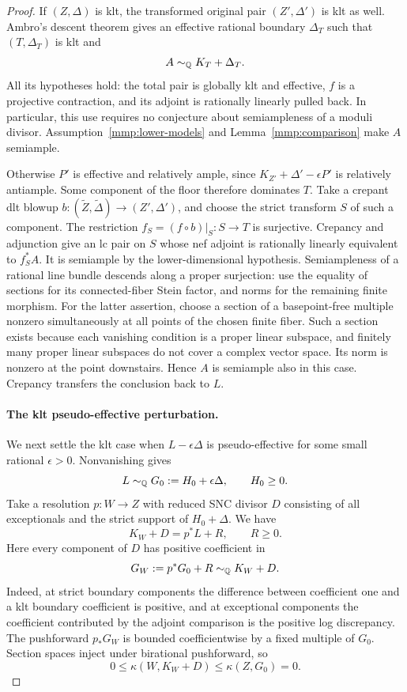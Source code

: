 \begin{proof}
If \((Z,\Delta)\) is klt, the transformed original pair
\((Z',\Delta')\) is klt as well. Ambro's descent theorem
\cite[Theorem~0.2]{Ambro2005} gives an effective rational
boundary \(\Delta_T\) such that \((T,\Delta_T)\) is klt and
\[
 A\sim_{\mathbb{Q}}K_T+\Delta_T.
\]
All its hypotheses hold: the total pair is globally klt and
effective, \(f\) is a projective contraction, and its adjoint
is rationally linearly pulled back. In particular, this use
requires no conjecture about semiampleness of a moduli divisor.
Assumption~\ref{mmp:lower-models} and
Lemma~\ref{mmp:comparison} make \(A\) semiample.

Otherwise \(P'\) is effective and relatively ample, since
\(K_{Z'}+\Delta'-\epsilon P'\) is relatively antiample.
Some component of the floor therefore dominates \(T\).
Take a crepant dlt blowup $b:(\widetilde Z,\widetilde\Delta)
\to(Z',\Delta')$, and choose the strict transform $S$ of such
a component. The restriction $f_S=(f\circ b)|_S:S\to T$ is
surjective. Crepancy and adjunction give an lc pair on $S$
whose nef adjoint is rationally linearly equivalent to $f_S^*A$.
It is semiample by the lower-dimensional hypothesis.
Semiampleness of a rational line bundle descends along a proper
surjection: use the equality of sections for its connected-fiber
Stein factor, and norms for the remaining finite morphism.
For the latter assertion, choose a section of a basepoint-free
multiple nonzero simultaneously at all points of the chosen
finite fiber. Such a section exists because each vanishing
condition is a proper linear subspace, and finitely many proper
linear subspaces do not cover a complex vector space. Its norm
is nonzero at the point downstairs. Hence \(A\) is semiample
also in this case. Crepancy transfers the conclusion back to \(L\).

\paragraph{The klt pseudo-effective perturbation.}
We next settle the klt case when \(L-\epsilon\Delta\) is
pseudo-effective for some small rational \(\epsilon>0\).
Nonvanishing gives
\[
 L\sim_{\mathbb{Q}}G_0:=H_0+\epsilon\Delta,\qquad H_0\geq 0.
\]
Take a resolution \(p\colon W\to Z\) with reduced SNC divisor
\(D\) consisting of all exceptionals and the strict support of
\(H_0+\Delta\). We have
\[
 K_W+D=p^*L+R,\qquad R\geq 0.
\]
Here every component of \(D\) has positive coefficient in
\[
 G_W:=p^*G_0+R\sim_{\mathbb{Q}}K_W+D.
\]
Indeed, at strict boundary components the difference between
coefficient one and a klt boundary coefficient is positive,
and at exceptional components the coefficient contributed by
the adjoint comparison is the positive log discrepancy.
The pushforward \(p_*G_W\) is bounded coefficientwise by a
fixed multiple of \(G_0\). Section spaces inject under
birational pushforward, so
\[
 0\leq\kappa(W,K_W+D)\leq\kappa(Z,G_0)=0.
\]


\end{proof}
